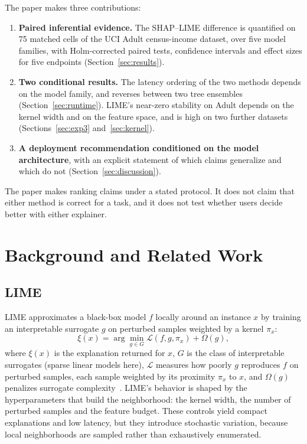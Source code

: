 \documentclass{cleiej}
\begin{document}
The paper makes three contributions:
\begin{enumerate}
\item \textbf{Paired inferential evidence.} The SHAP--LIME difference is
quantified on 75 matched cells of the UCI Adult census-income dataset, over
five model families, with Holm-corrected paired tests, confidence intervals
and effect sizes for five endpoints (Section~\ref{sec:results}).
\item \textbf{Two conditional results.} The latency ordering of the two
methods depends on the model family, and reverses between two tree
ensembles (Section~\ref{sec:runtime}). LIME's near-zero stability on Adult
depends on the kernel width and on the feature space, and is high on two
further datasets (Sections~\ref{sec:exp3} and~\ref{sec:kernel}).
\item \textbf{A deployment recommendation conditioned on the model
architecture}, with an explicit statement of which claims generalize and
which do not (Section~\ref{sec:discussion}).
\end{enumerate}

The paper makes ranking claims under a stated protocol. It does not claim
that either method is correct for a task, and it does not test whether users
decide better with either explainer.

\section{Background and Related Work}
\label{sec:background}

\subsection{LIME}

LIME approximates a black-box model $f$ locally around an instance $x$ by
training an interpretable surrogate $g$ on perturbed samples weighted by a
kernel $\pi_x$:
\begin{equation}
\xi(x) = \arg\min_{g \in G} \mathcal{L}(f, g, \pi_x) + \Omega(g),
\label{eq:lime}
\end{equation}
where $\xi(x)$ is the explanation returned for $x$, $G$ is the class of
interpretable surrogates (sparse linear models here), $\mathcal{L}$
measures how poorly $g$ reproduces $f$ on perturbed samples, each sample
weighted by its proximity $\pi_x$ to $x$, and $\Omega(g)$ penalizes
surrogate complexity~\cite{ribeiro2016why}. LIME's behavior is shaped by
the hyperparameters that build the neighborhood: the kernel width, the
number of perturbed samples and the feature budget. These controls yield
compact explanations and low latency, but they introduce stochastic
variation, because local neighborhoods are sampled rather than exhaustively
enumerated.
\end{document}
